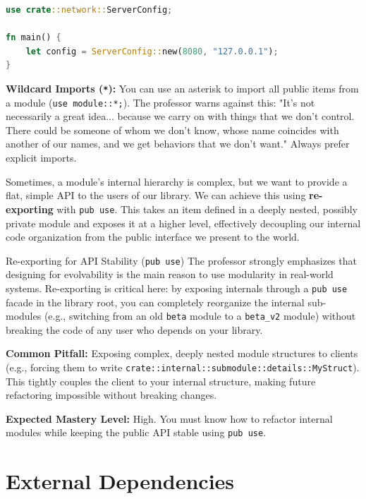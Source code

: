 \begin{lstlisting}[language=Rust]
use crate::network::ServerConfig;

fn main() {
    let config = ServerConfig::new(8080, "127.0.0.1");
}
\end{lstlisting}

\begin{warningbox}
\textbf{Wildcard Imports (\texttt{*}):} You can use an asterisk to import all public items from a module (\texttt{use module::*;}). The professor warns against this: "It's not necessarily a great idea... because we carry on with things that we don't control. There could be someone of whom we don't know, whose name coincides with another of our names, and we get behaviors that we don't want." Always prefer explicit imports.
\end{warningbox}

Sometimes, a module's internal hierarchy is complex, but we want to provide a flat, simple API to the users of our library. We can achieve this using \textbf{re-exporting} with \texttt{pub use}. This takes an item defined in a deeply nested, possibly private module and exposes it at a higher level, effectively decoupling our internal code organization from the public interface we present to the world.

\begin{examprioritybox}{Re-exporting for API Stability (\texttt{pub use})}
The professor strongly emphasizes that designing for evolvability is the main reason to use modularity in real-world systems. Re-exporting is critical here: by exposing internals through a \texttt{pub use} facade in the library root, you can completely reorganize the internal sub-modules (e.g., switching from an old \texttt{beta} module to a \texttt{beta\_v2} module) without breaking the code of any user who depends on your library.

\textbf{Common Pitfall:} Exposing complex, deeply nested module structures to clients (e.g., forcing them to write \texttt{crate::internal::submodule::details::MyStruct}). This tightly couples the client to your internal structure, making future refactoring impossible without breaking changes.

\textbf{Expected Mastery Level:} High. You must know how to refactor internal modules while keeping the public API stable using \texttt{pub use}.
\end{examprioritybox}

\section{External Dependencies}

